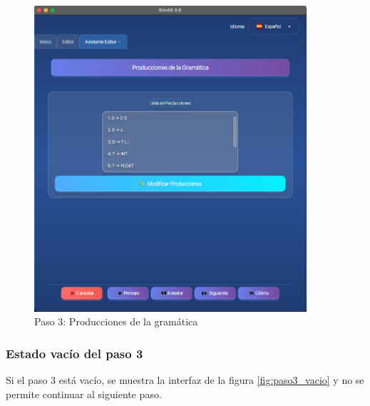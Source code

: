 \needspace{8cm}
\begin{figure}[H]
    \centering
    \includegraphics[width=0.9\textwidth]{figuras/editor/paso3_producciones.png}
    \caption{Paso 3: Producciones de la gramática}
    \label{fig:paso3_producciones}
\end{figure}

\subsubsection{Estado vacío del paso 3}

Si el paso 3 está vacío, se muestra la interfaz de la figura \ref{fig:paso3_vacio} y no se permite continuar al siguiente paso.

